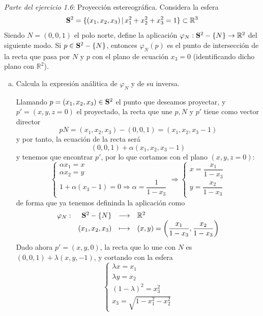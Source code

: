 \begin{ejer}
    [2] \textit{Parte del ejercicio 1.6}: Proyecci\'on estereogr\'afica. Considera la esfera
        $$\bold S^2 = \{(x_1,x_2,x_3) \, | \, x_1^2 + x_2^2 +x_3^2 = 1\} \subset \mathbb R^3$$
        Siendo $N = (0, 0, 1)$ el polo norte, define la aplicaci\'on $\varphi_N : \bold S^2 - \{N\} \to \mathbb R^2$ del   
        siguiente modo. Si $p \in \bold S^2 - \{N\}$, entonces $\varphi_N (p)$ es el punto de intersecci\'on de la
        recta que pasa por $N$ y $p$ con el plano de ecuaci\'on $x_3 = 0$ (identificando dicho plano con $\mathbb R^2$).
        \begin{enumerate}[a)]
            \item Calcula la expresi\'on an\'alitica de $\varphi_N$ y de su inversa.
            \begin{sol}
                Llamando $p=(x_1,x_2,x_3) \in \bold{S}^2$ el punto que deseamos proyectar, y $p'=(x,y,z=0)$ el proyectado, la recta que une $p, N$ y $p'$ tiene como vector director
                $$pN= (x_1,x_2,x_3) - (0,0,1)= (x_1, x_2, x_3-1)$$
                y por tanto, la ecuaci\'on de la recta ser\'a
                $$(0,0,1) + \alpha (x_1, x_2, x_3-1)$$
                y tenemos que encontrar $p'$, por lo que cortamos con el plano $(x,y,z=0)$:
                $$\begin{cases}
                    \alpha x_1 = x \\ \alpha x_2 = y \\ 1+\alpha(x_3-1) = 0 \Rightarrow \alpha = \dfrac{1}{1-x_3}
                \end{cases} 
                \Rightarrow \begin{cases}
                    x= \dfrac{x_1}{1-x_3} \\ y= \dfrac{x_2}{1-x_3} 
                \end{cases}$$
                de forma que ya tenemos defininda la aplicaci\'on como
                $$\begin{array}{rrcl}
                     \varphi_N : & \bold S^2 - \{N\} & \longrightarrow & \mathbb R^2  \\
                     &(x_1,x_2,x_3) & \longmapsto & (x,y)=\left( \dfrac{x_1}{1-x_3}, \dfrac{x_2}{1-x_3}\right) 
                \end{array}$$
                Dado ahora $p'=(x,y,0)$, la recta que lo une con $N$ es $(0,0,1) + \lambda (x,y,-1)$, y cortando con la esfera
                $$\begin{cases}
                    \lambda x = x_1 \\ \lambda y = x_2 \\ (1 - \lambda)^2 = x_3^2  \\ x_3 = \sqrt{1-x_1^2 - x_2^2} 

\end{cases}$$
\end{sol}
\end{enumerate}
\end{ejer}
